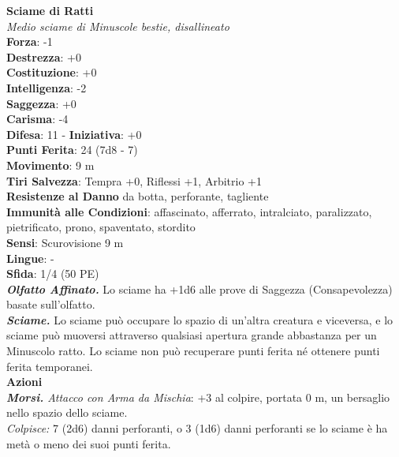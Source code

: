 \begin{multicols}{2}
\medskip\textbf{Sciame di Ratti}\\
\emph{Medio sciame di Minuscole bestie, disallineato}\\
\textbf{Forza}: -1\\
\textbf{Destrezza}: +0\\
\textbf{Costituzione}: +0\\
\textbf{Intelligenza}: -2\\
\textbf{Saggezza}: +0\\
\textbf{Carisma}: -4\\
\textbf{Difesa}: 11 - \textbf{Iniziativa}: +0\\
\textbf{Punti Ferita}: 24 (7d8 - 7)\\
\textbf{Movimento}: 9 m\\
\textbf{Tiri Salvezza}: Tempra +0, Riflessi +1, Arbitrio +1\\
\textbf{Resistenze al Danno} da botta, perforante, tagliente\\
\textbf{Immunità alle Condizioni}: affascinato, afferrato, intralciato, paralizzato, pietrificato, prono, spaventato, stordito\\
\textbf{Sensi}: Scurovisione 9 m\\
\textbf{Lingue}: -\\
\textbf{Sfida}: 1/4 (50 PE)\smallskip\\
\emph{\textbf{Olfatto Affinato.}} Lo sciame ha +1d6 alle prove di Saggezza (Consapevolezza) basate sull'olfatto.\\
\emph{\textbf{Sciame.}} Lo sciame può occupare lo spazio di un'altra creatura e viceversa, e lo sciame può muoversi attraverso qualsiasi apertura grande abbastanza per un Minuscolo ratto. Lo sciame non può recuperare punti ferita né ottenere punti ferita temporanei.\\
\smallskip\textbf{Azioni}\\
\emph{\textbf{Morsi.} Attacco con Arma da Mischia}: +3 al colpire, portata 0 m, un bersaglio nello spazio dello sciame.\\
\emph{Colpisce:} 7 (2d6) danni perforanti, o 3 (1d6) danni perforanti se lo sciame è ha metà o meno dei suoi punti ferita.\\


\end{multicols}
